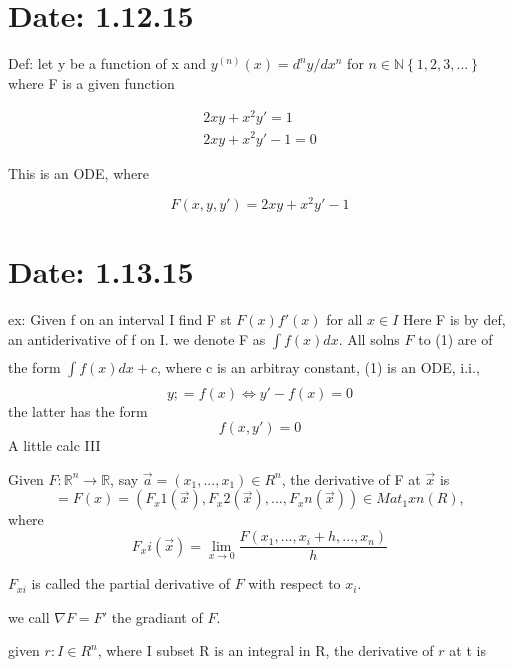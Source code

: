 
\section{Date: 1.12.15}
  
Def: let y be a function of x 
and $ y^{(n)}(x) = d^{n}y/dx^{n}$ for $n \in \mathbb{N} \left\{ 1, 2, 3, ...\right\} $ 
where F is a given function 

\begin{gather*}
  2xy + x^{2}y' = 1\\ 
  2xy + x^{2}y'-1 = 0
\end{gather*}

This is an ODE, where 

\begin{equation*}
  F(x,y,y') = 2xy + x^{2}y'-1 
\end{equation*}

\section{Date: 1.13.15}
  ex: Given f on an interval I find F st 
  $F(x)f'(x)$ for all $x \in I$
  Here F is by def, an antiderivative of f
  on I. we denote F as $\int\limits_{}^{}f(x)dx$.
  All solns $F$ to (1) are of the form $\int\limits_{}^{}f(x)dx+c$, 
  where c is an arbitray constant,
  (1) is an ODE, i.i.,
  \begin{equation*}
    y; = f(x) \iff y'-f(x) = 0
  \end{equation*}
  the latter has the form 
  \begin{equation*}
    f(x,y') = 0 
  \end{equation*}
  A little calc III

  Given $F: \mathbb{R}^n \to \mathbb{R}$, 
  say $\vec{a}=(x_1,...,x_1) \in R^n$, 
  the derivative of F at $\vec{x}$ is 
$$    =F(x)=(F_x1(\vec{x}), F_x2(\vec{x}),..., F_xn(\vec{x})) \in Mat_1xn(R),$$ where 
$$    F_xi(\vec{x})=  \lim_{x \to 0} \frac{F(x_1,..., x_i+h,..., x_n)}{h} $$



  $F_{xi}$ is called the partial derivative of $F$
  with respect to $x_i$. 

  we call $\nabla F = F'$ 
  the gradiant of $F$.

  given $r : I \in R^n$, where I subset R is an integral 
  in R, the derivative of $r$ at t is 

